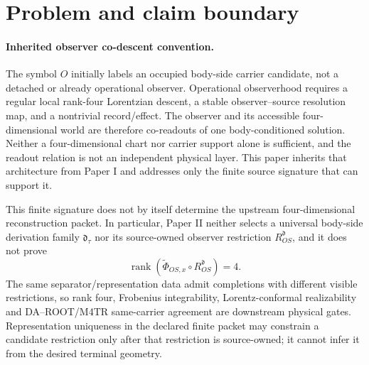 \documentclass[11pt]{article}
\begin{document}
\begin{center}
\end{center}
\tableofcontents
\clearpage

\section{Problem and claim boundary}

\paragraph{Inherited observer co-descent convention.}
The symbol $O$ initially labels an occupied body-side carrier candidate,
not a detached or already operational observer.  Operational observerhood
requires a regular local rank-four Lorentzian descent, a stable
observer--source resolution map, and a nontrivial record/effect.  The observer
and its accessible four-dimensional world are therefore co-readouts of one
body-conditioned solution.  Neither a four-dimensional chart nor carrier
support alone is sufficient, and the readout relation is not an independent
physical layer.  This paper inherits that architecture from Paper I and
addresses only the finite source signature that can support it.

This finite signature does not by itself determine the upstream
four-dimensional reconstruction packet.  In particular, Paper II neither
selects a universal body-side derivation family $\mathfrak d_\tau$ nor its
source-owned observer restriction $R^{\mathfrak d}_{OS}$, and it does not
prove
\[
 \operatorname{rank}\!\left(\widetilde\Phi_{OS,x}
       \circ R^{\mathfrak d}_{OS}\right)=4.
\]
The same separator/representation data admit completions with different
visible restrictions, so rank four, Frobenius integrability,
Lorentz-conformal realizability and DA--ROOT/M4TR same-carrier agreement are
downstream physical gates.  Representation uniqueness in the declared finite
packet may constrain a candidate restriction only after that restriction is
source-owned; it cannot infer it from the desired terminal geometry.
\end{document}
